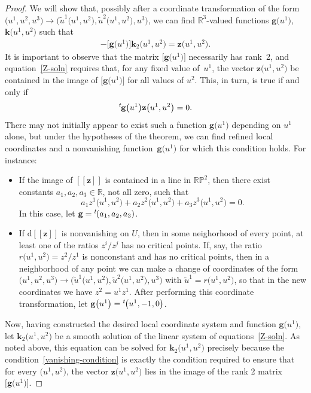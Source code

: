 \documentclass[pdftex]{sigma}
\numberwithin{equation}{section}
\renewcommand{\d}{\mathrm{d}}%
\newcommand{\bbR}{{\mathbb R}}
\newcommand{\bbP}{{\mathbb P}}
\newcommand{\mbg}{\mathbf{g}}
\newcommand{\mbk}{\mathbf{k}}
\newcommand{\mbz}{\mathbf{z}}
\begin{document}
\begin{proof}We will show that, possibly after a coordinate transformation of the form $\big(u^1, u^2, u^3\big) \to \big(\tilde{u}^1\big(u^1, u^2\big), \tilde{u}^2\big(u^1, u^2\big), u^3\big)$, we can find $\bbR^3$-valued functions $\mbg\big(u^1\big)$, $\mbk\big(u^1, u^2\big)$ such that
\begin{gather}\label{Z-soln}
 -\big[\mbg\big(u^1\big)\big] \mbk_2\big(u^1, u^2\big) = \mbz\big(u^1, u^2\big).
\end{gather}
It is important to observe that the matrix $\big[\mbg\big(u^1\big)\big]$ necessarily
has rank~2, and equation~\eqref{Z-soln} requires that, for any fixed value of~$u^1$, the vector $\mbz\big(u^1, u^2\big)$ be contained in the image of $\big[\mbg\big(u^1\big)\big]$ for all values of $u^2$. This, in turn, is true if and only if
\begin{gather}\label{vanishing-condition}
{}^t\hskip-1pt \mbg\big(u^1\big) \mbz\big(u^1, u^2\big) = 0.
\end{gather}
There may not initially appear to exist such a function $\mbg\big(u^1\big)$ depending on $u^1$ alone, but under the hypotheses of the theorem, we can find refined local coordinates and a nonvanishing func\-tion~$\mbg\big(u^1\big)$ for which this condition holds. For instance:
\begin{itemize}\itemsep=0pt
\item If the image of $[\![\mbz]\!]$ is contained in a line in $\bbR \bbP^2$, then there exist constants $a_1, a_2, a_3 \in \bbR$, not all zero, such that
\[ a_1 z^1\big(u^1, u^2\big) + a_2 z^2\big(u^1, u^2\big) + a_3 z^3\big(u^1, u^2\big) = 0. \]
In this case, let $\mbg = {}^t\hskip-1pt (a_1 , a_2, a_3 )$.
\item If $\d[\![\mbz]\!]$ is nonvanishing on $U$, then in some neighorhood of every point, at least one of the ratios $z^i/z^j$ has no critical points. If, say, the ratio $r\big(u^1, u^2\big) = z^2/z^1$ is nonconstant and has no critical points, then in a neighborhood of any point we can make a change of coordinates of the form $\big(u^1, u^2, u^3\big) \to \big(\tilde{u}^1\big(u^1, u^2\big), \tilde{u}^2\big(u^1, u^2\big), u^3\big)$ with $\tilde{u}^1 = r\big(u^1, u^2\big)$, so that in the new coordinates we have $z^2 = u^1 z^1$. After performing this coordinate transformation, let $\mbg\big(u^1\big) = {}^t\hskip-1pt \big( u^1, -1, 0 \big)$.
\end{itemize}
Now, having constructed the desired local coordinate system and function $\mbg\big(u^1\big)$, let $\mbk_2\big(u^1, u^2\big)$ be a smooth solution of the linear system of equations~\eqref{Z-soln}. As noted above, this equation can be solved for $\mbk_2\big(u^1, u^2\big)$ precisely because the condition~\eqref{vanishing-condition} is exactly the condition required to ensure that for every $\big(u^1, u^2\big)$, the vector $\mbz\big(u^1, u^2\big)$ lies in the image of the rank 2 matrix~$\big[\mbg\big(u^1\big)\big]$.


\end{proof}
\end{document}
